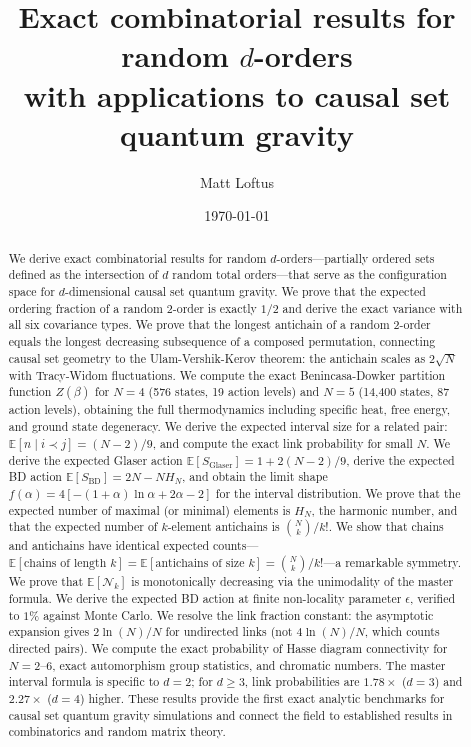 \documentclass[aps,prd,twocolumn,superscriptaddress,nofootinbib]{revtex4-2}
\begin{document}
\title{Exact combinatorial results for random $d$-orders\\with applications to causal set quantum gravity}

\author{Matt Loftus}

\date{\today}

\begin{abstract}
We derive exact combinatorial results for random $d$-orders---partially ordered sets defined as the intersection of $d$ random total orders---that serve as the configuration space for $d$-dimensional causal set quantum gravity. We prove that the expected ordering fraction of a random 2-order is exactly $1/2$ and derive the exact variance with all six covariance types. We prove that the longest antichain of a random 2-order equals the longest decreasing subsequence of a composed permutation, connecting causal set geometry to the Ulam-Vershik-Kerov theorem: the antichain scales as $2\sqrt{N}$ with Tracy-Widom fluctuations. We compute the exact Benincasa-Dowker partition function $Z(\beta)$ for $N = 4$ (576 states, 19 action levels) and $N = 5$ (14,400 states, 87 action levels), obtaining the full thermodynamics including specific heat, free energy, and ground state degeneracy. We derive the expected interval size for a related pair: $\mathbb{E}[n \mid i \prec j] = (N-2)/9$, and compute the exact link probability for small $N$. We derive the expected Glaser action $\mathbb{E}[S_{\mathrm{Glaser}}] = 1 + 2(N-2)/9$, derive the expected BD action $\mathbb{E}[S_{\mathrm{BD}}] = 2N - N H_N$, and obtain the limit shape $f(\alpha) = 4[-(1+\alpha)\ln\alpha + 2\alpha - 2]$ for the interval distribution. We prove that the expected number of maximal (or minimal) elements is $H_N$, the harmonic number, and that the expected number of $k$-element antichains is $\binom{N}{k}/k!$. We show that chains and antichains have identical expected counts---$\mathbb{E}[\text{chains of length } k] = \mathbb{E}[\text{antichains of size } k] = \binom{N}{k}/k!$---a remarkable symmetry. We prove that $\mathbb{E}[\mathcal{N}_k]$ is monotonically decreasing via the unimodality of the master formula. We derive the expected BD action at finite non-locality parameter $\epsilon$, verified to $1\%$ against Monte Carlo. We resolve the link fraction constant: the asymptotic expansion gives $2\ln(N)/N$ for undirected links (not $4\ln(N)/N$, which counts directed pairs). We compute the exact probability of Hasse diagram connectivity for $N = 2$--$6$, exact automorphism group statistics, and chromatic numbers. The master interval formula is specific to $d = 2$; for $d \geq 3$, link probabilities are $1.78\times$ ($d = 3$) and $2.27\times$ ($d = 4$) higher. These results provide the first exact analytic benchmarks for causal set quantum gravity simulations and connect the field to established results in combinatorics and random matrix theory.
\end{abstract}
\end{document}
